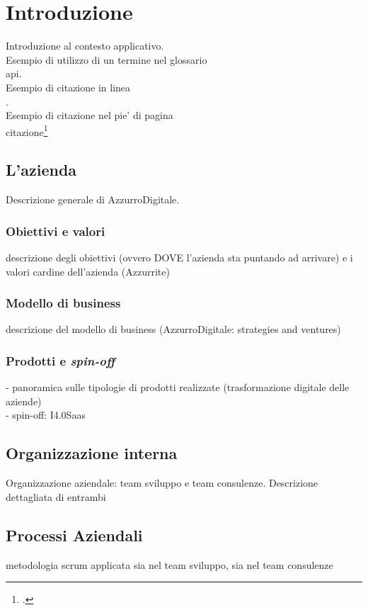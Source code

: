 \newpage
\chapter{Introduzione}
\label{cap:introduzione}

Introduzione al contesto applicativo.\\

\noindent Esempio di utilizzo di un termine nel glossario \\
\gls{api}. \\

\noindent Esempio di citazione in linea \\
\cite{site:agile-manifesto}. \\

\noindent Esempio di citazione nel pie' di pagina \\
citazione\footcite{womak:lean-thinking} \\

\section{L'azienda}

Descrizione generale di AzzurroDigitale.\\

\subsection{Obiettivi e valori}
descrizione degli obiettivi (ovvero DOVE l'azienda sta puntando ad arrivare) e i valori cardine dell'azienda (Azzurrite)\\
\subsection{Modello di business}
descrizione del modello di business (AzzurroDigitale: strategies and ventures)\\
\subsection{Prodotti e \textit{spin-off}}
- panoramica sulle tipologie di prodotti realizzate (trasformazione digitale delle aziende)\\
- spin-off: I4.0Saas\\
\section{Organizzazione interna}
Organizzazione aziendale: team sviluppo e team consulenze. Descrizione dettagliata di entrambi
\section{Processi Aziendali}
metodologia scrum applicata sia nel team sviluppo, sia nel team consulenze